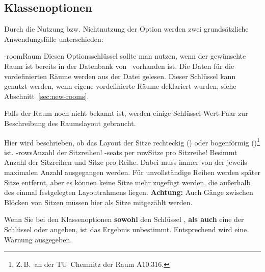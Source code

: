\documentclass[
babel-options={ngerman},
load-preamble-,
scrartcl={headings=small}
]{cnltx-doc}
\providecommand{\packagename}{seatingchart}
\def\thepkg{\pkg*{\packagename}}
\begin{document}
\subsection{Klassenoptionen}
\label{sec:class-options}
Durch die Nutzung bzw. Nichtnutzung der Option  werden zwei
grundsätzliche Anwendungsfälle unterschieden:
\begin{options}
  \keyval-{room}{Raum}\Default{}
  Diesen Optionsschlüssel sollte man nutzen, wenn der gewünschte
  Raum ist bereits in der Datenbank von \thepkg\ vorhanden ist.
  Die Daten für die vordefinierten Räume werden
  aus der Datei  gelesen. 
  Dieser Schlüssel kann genutzt werden, wenn eigene vordefinierte Räume deklariert
  wurden, siehe Abschnitt~\ref{sec:new-rooms}.
\end{options}
Falls der Raum noch nicht bekannt ist, werden einige Schlüssel-Wert-Paar zur
Beschreibung des Raumslayout gebraucht.
\begin{options}
  Hier wird beschrieben, ob das Layout der Sitze rechteckig
  () oder bogenförmig ()\footnote{Z.\,B.\ an der
    TU~Chemnitz der Raum A10.316.} ist.
  \keyval-{rows}{Anzahl der Sitzreihen}\Default*!{}\vspace{-.3\baselineskip}
  \keyval-{seats per row}{Sitze pro Sitzreihe}\Default!{}
  Besimmt Anzahl der Sitzreihen und Sitze pro Reihe. Dabei muss immer von der
  jeweils maximalen Anzahl ausgegangen werden. Für unvollständige Reihen werden später Sitze
  entfernt, aber es können keine Sitze mehr zugefügt werden, die außerhalb des einmal
  festgelegten Layoutrahmens liegen. \textbf{Achtung:} Auch Gänge zwischen
  Blöcken von Sitzen müssen hier als Sitze mitgezählt werden.
\end{options}
Wenn Sie bei den Klassenoptionen \textbf{sowohl} den Schlüssel , \textbf{als auch}
eine der Schlüssel  oder  angeben, ist das Ergebnis
unbestimmt. Entsprechend wird eine Warnung ausgegeben.\medskip
\end{document}

